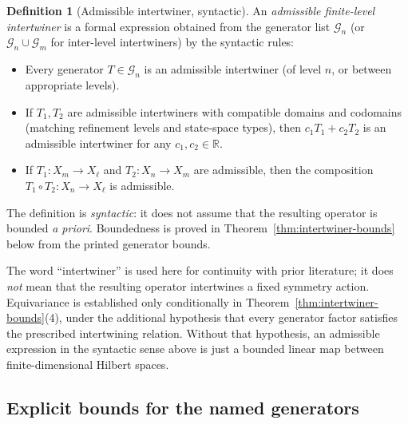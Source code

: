 \documentclass[11pt, a4paper]{amsart}
\theoremstyle{definition}
\newtheorem{definition}[theorem]{Definition}
\newcommand{\R}{\mathbb{R}}
\begin{document}
\begin{definition}[Admissible intertwiner, syntactic]
\label{def:admissible}
An \emph{admissible finite-level intertwiner} is a formal
expression obtained from the generator list $\mathcal{G}_n$ (or
$\mathcal{G}_n \cup \mathcal{G}_m$ for inter-level intertwiners)
by the syntactic rules:
\begin{itemize}
\item Every generator $T \in \mathcal{G}_n$ is an admissible
  intertwiner (of level $n$, or between appropriate levels).
\item If $T_1, T_2$ are admissible intertwiners with compatible
  domains and codomains (matching refinement levels and state-space
  types), then $c_1 T_1 + c_2 T_2$ is an admissible intertwiner
  for any $c_1, c_2 \in \R$.
\item If $T_1 \colon X_m \to X_\ell$ and $T_2 \colon X_n \to X_m$
  are admissible, then the composition $T_1 \circ T_2 \colon X_n
  \to X_\ell$ is admissible.
\end{itemize}
The definition is \emph{syntactic}: it does not assume that the
resulting operator is bounded \emph{a priori}. Boundedness is
proved in Theorem~\ref{thm:intertwiner-bounds} below from the
printed generator bounds.

The word ``intertwiner'' is used here for continuity with prior
literature; it does \emph{not} mean that the resulting operator
intertwines a fixed symmetry action. Equivariance is established
only conditionally in Theorem~\ref{thm:intertwiner-bounds}(4),
under the additional hypothesis that every generator factor
satisfies the prescribed intertwining relation. Without that
hypothesis, an admissible expression in the syntactic sense above
is just a bounded linear map between finite-dimensional Hilbert
spaces.
\end{definition}

\subsection{Explicit bounds for the named generators}
\end{document}
